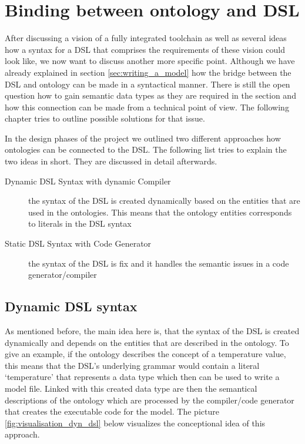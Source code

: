 \section{Binding between ontology and DSL}
\par
After discussing a vision of a fully integrated toolchain as well as several ideas how a syntax for a DSL that comprises the requirements of  these vision could look like, we now want to discuss another more specific point. Although we have already explained in section \ref{sec:writing_a_model} how the bridge between the DSL and ontology can be made in a syntactical manner. There is still the open question how to gain semantic data types as they are required in the section  and how this connection can be made from a technical point of view. The following chapter tries to outline possible solutions for that issue.
\par
In the design phases of the project we outlined two different approaches how ontologies can be connected to the DSL. The following list tries to explain the two ideas in short. They are discussed in detail afterwards.
\begin{description}
	\item[Dynamic DSL Syntax with dynamic Compiler] the syntax of the DSL is created dynamically based on the entities that are used in the ontologies. This means that the ontology entities corresponds to  literals in the DSL syntax
	\item[Static DSL Syntax with Code Generator] the syntax of the DSL is fix and it handles the semantic issues in a code generator/compiler
\end{description}

\subsection{Dynamic DSL syntax}
\par
As mentioned before, the main idea here is, that the syntax of the DSL is created dynamically and depends on the entities that are described in the ontology. To give an example, if the ontology describes the concept of a temperature value, this means that the DSL's underlying grammar would contain a literal ‘temperature’ that  represents a data type which then can be used to write a model file. Linked with this created data type are then the semantical descriptions of the ontology which are processed by the compiler/code generator that creates the executable code for the model. The picture \ref{fig:visualisation_dyn_dsl} below visualizes the conceptional idea of this approach.

